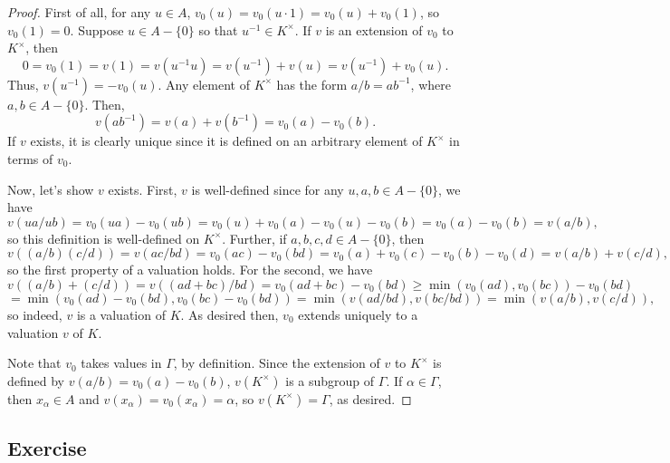 \begin{proof}
First of all, for any $u \in A$, $v_0(u) = v_0(u\cdot 1) = v_0(u) + v_0(1)$, so $v_0(1) = 0$. Suppose $u \in A - \{0\}$ so that $u^{-1} \in K^{\times}$. 
If $v$ is an extension of $v_0$ to $K^{\times}$, then 
$$0 = v_0(1) = v(1) = v(u^{-1}u) = v(u^{-1}) + v(u) = v(u^{-1}) + v_0(u).$$
Thus, $v(u^{-1}) = -v_0(u)$. Any element of $K^{\times}$ has the form $a/b = ab^{-1}$, where $a,b \in A - \{0\}$. Then,
$$v(ab^{-1}) = v(a) + v(b^{-1}) = v_0(a) - v_0(b).$$
If $v$ exists, it is clearly unique since it is defined on an arbitrary element of $K^{\times}$ in terms of $v_0$.

Now, let's show $v$ exists. First, $v$ is well-defined since for any $u,a,b \in A - \{0\}$, we have
$$v(ua/ub) = v_0(ua) - v_0(ub) = v_0(u) + v_0(a) - v_0(u) - v_0(b) = v_0(a) - v_0(b) = v(a/b),$$
so this definition is well-defined on $K^{\times}$. Further, if $a,b,c,d \in A - \{0\}$, then
$$v((a/b)(c/d)) = v(ac/bd) = v_0(ac) - v_0(bd) = v_0(a) + v_0(c) - v_0(b) - v_0(d) = v(a/b) + v(c/d),$$
so the first property of a valuation holds. For the second, we have
$$v((a/b) + (c/d)) = v((ad + bc)/bd) = v_0(ad + bc) - v_0(bd) \ge \min(v_0(ad),v_0(bc)) - v_0(bd)$$
$$= \min(v_0(ad)- v_0(bd),v_0(bc)- v_0(bd)) = \min(v(ad/bd),v(bc/bd)) = \min(v(a/b),v(c/d)),$$
so indeed, $v$ is a valuation of $K$. As desired then, $v_0$ extends uniquely to a valuation $v$ of $K$.

Note that $v_0$ takes values in $\Gamma$, by definition. Since the extension of $v$ to $K^{\times}$ is defined by $v(a/b) = v_0(a) - v_0(b)$, 
$v(K^{\times})$ is a subgroup of $\Gamma$. If $\alpha \in \Gamma$, then $x_{\alpha} \in A$ and $v(x_{\alpha}) = v_0(x_{\alpha}) = \alpha$, 
so $v(K^{\times}) = \Gamma$, as desired.
\end{proof}

\subsection{Exercise}\label{5.34}

